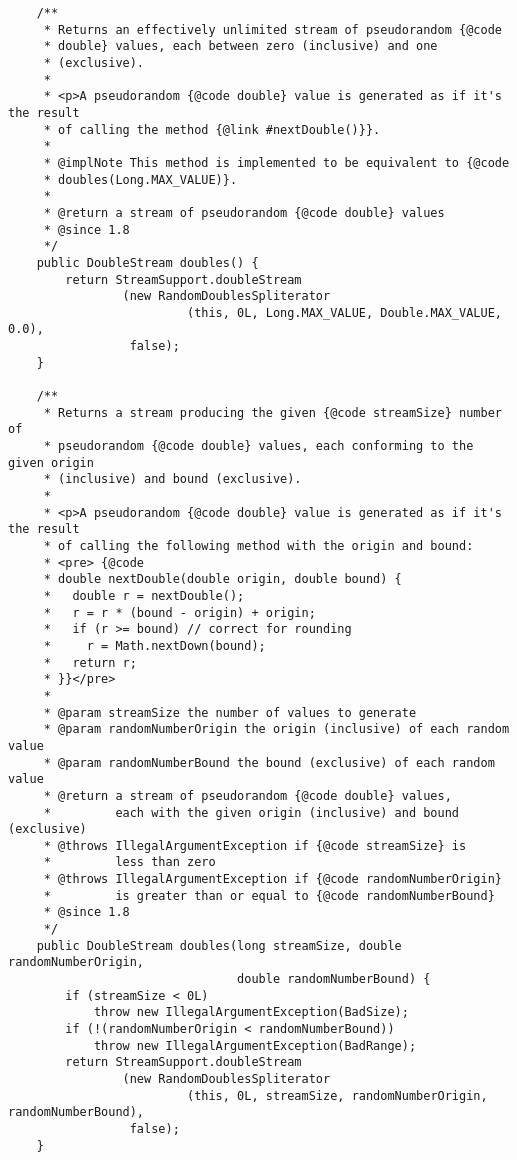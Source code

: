 \documentclass[12pt,a4paper,twoside,openright,titlepage,final]{article}
\begin{document}
\begin{verbatim}
    /**
     * Returns an effectively unlimited stream of pseudorandom {@code
     * double} values, each between zero (inclusive) and one
     * (exclusive).
     *
     * <p>A pseudorandom {@code double} value is generated as if it's the result
     * of calling the method {@link #nextDouble()}}.
     *
     * @implNote This method is implemented to be equivalent to {@code
     * doubles(Long.MAX_VALUE)}.
     *
     * @return a stream of pseudorandom {@code double} values
     * @since 1.8
     */
    public DoubleStream doubles() {
        return StreamSupport.doubleStream
                (new RandomDoublesSpliterator
                         (this, 0L, Long.MAX_VALUE, Double.MAX_VALUE, 0.0),
                 false);
    }

    /**
     * Returns a stream producing the given {@code streamSize} number of
     * pseudorandom {@code double} values, each conforming to the given origin
     * (inclusive) and bound (exclusive).
     *
     * <p>A pseudorandom {@code double} value is generated as if it's the result
     * of calling the following method with the origin and bound:
     * <pre> {@code
     * double nextDouble(double origin, double bound) {
     *   double r = nextDouble();
     *   r = r * (bound - origin) + origin;
     *   if (r >= bound) // correct for rounding
     *     r = Math.nextDown(bound);
     *   return r;
     * }}</pre>
     *
     * @param streamSize the number of values to generate
     * @param randomNumberOrigin the origin (inclusive) of each random value
     * @param randomNumberBound the bound (exclusive) of each random value
     * @return a stream of pseudorandom {@code double} values,
     *         each with the given origin (inclusive) and bound (exclusive)
     * @throws IllegalArgumentException if {@code streamSize} is
     *         less than zero
     * @throws IllegalArgumentException if {@code randomNumberOrigin}
     *         is greater than or equal to {@code randomNumberBound}
     * @since 1.8
     */
    public DoubleStream doubles(long streamSize, double randomNumberOrigin,
                                double randomNumberBound) {
        if (streamSize < 0L)
            throw new IllegalArgumentException(BadSize);
        if (!(randomNumberOrigin < randomNumberBound))
            throw new IllegalArgumentException(BadRange);
        return StreamSupport.doubleStream
                (new RandomDoublesSpliterator
                         (this, 0L, streamSize, randomNumberOrigin, randomNumberBound),
                 false);
    }


\end{verbatim}
\end{document}
